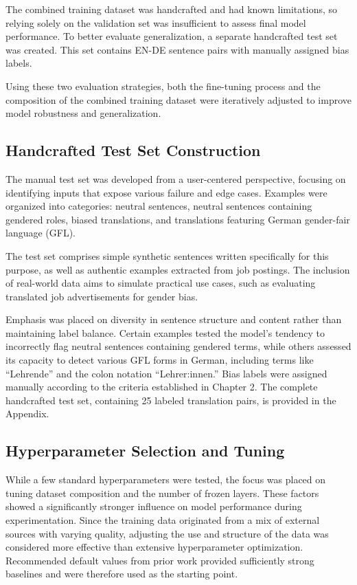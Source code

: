     The combined training dataset was handcrafted and had known limitations, so relying solely on the validation set was insufficient to assess final model performance. To better evaluate generalization, a separate handcrafted test set was created. This set contains EN-DE sentence pairs with manually assigned bias labels.

    Using these two evaluation strategies, both the fine-tuning process and the composition of the combined training dataset were iteratively adjusted to improve model robustness and generalization.

\subsection{Handcrafted Test Set Construction} \label{subsection:eval_dataset}
    The manual test set was developed from a user-centered perspective, focusing on identifying inputs that expose various failure and edge cases. Examples were organized into categories: neutral sentences, neutral sentences containing gendered roles, biased translations, and translations featuring German gender-fair language (GFL). 

    The test set comprises simple synthetic sentences written specifically for this purpose, as well as authentic examples extracted from job postings. The inclusion of real-world data aims to simulate practical use cases, such as evaluating translated job advertisements for gender bias.

    Emphasis was placed on diversity in sentence structure and content rather than maintaining label balance. Certain examples tested the model’s tendency to incorrectly flag neutral sentences containing gendered terms, while others assessed its capacity to detect various GFL forms in German, including terms like “Lehrende” and the colon notation “Lehrer:innen.” Bias labels were assigned manually according to the criteria established in Chapter 2. The complete handcrafted test set, containing 25 labeled translation pairs, is provided in the Appendix.

\subsection{Hyperparameter Selection and Tuning} \label{subsection:hyperparameter_tuning_methodology}
     While a few standard hyperparameters were tested, the focus was placed on tuning dataset composition and the number of frozen layers. These factors showed a significantly stronger influence on model performance during experimentation. Since the training data originated from a mix of external sources with varying quality, adjusting the use and structure of the data was considered more effective than extensive hyperparameter optimization. Recommended default values from prior work provided sufficiently strong baselines and were therefore used as the starting point.

